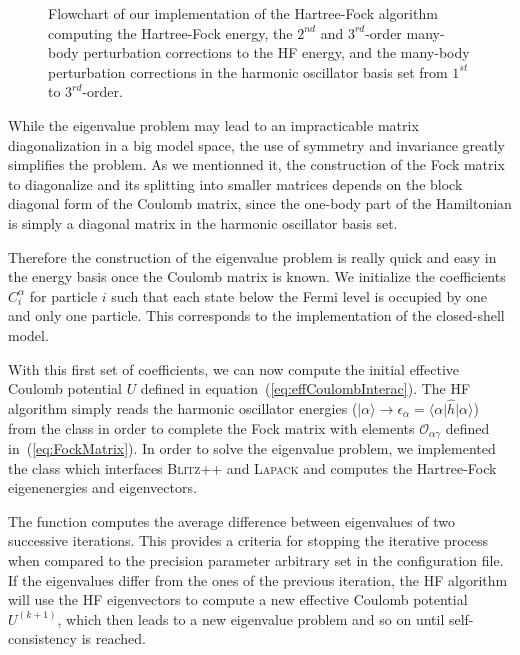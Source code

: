\begin{figure}
\centering
\scalebox{0.7}{}
\caption{\label{fig:diagramHF}Flowchart of our implementation of the Hartree-Fock algorithm computing the Hartree-Fock energy, the $2^{nd}$ and $3^{rd}$-order many-body perturbation corrections to the HF energy, and the many-body perturbation corrections in the harmonic oscillator basis set from $1^{st}$ to $3^{rd}$-order.}
\end{figure}

While the eigenvalue problem may lead to an impracticable matrix diagonalization in a big model space, the use of symmetry and invariance greatly simplifies the problem. As we mentionned it, the construction of the Fock matrix to diagonalize and its splitting into smaller matrices depends on the block diagonal form of the Coulomb matrix, since the one-body part of the Hamiltonian is simply a diagonal matrix in the harmonic oscillator basis set.

Therefore the construction of the eigenvalue problem is really quick and easy in the energy basis once the Coulomb matrix is known. We initialize the coefficients $C_i^{\alpha}$ for particle $i$ such that each state below the Fermi level is occupied by one and only one particle. This corresponds to the implementation of the closed-shell model.

With this first set of coefficients, we can now compute the initial effective Coulomb potential $U$ defined in equation~(\ref{eq:effCoulombInterac}). The HF algorithm simply reads the harmonic oscillator energies ($|\alpha \rangle  \rightarrow \epsilon_{\alpha}=\langle \alpha|\hat{h} | \alpha \rangle$) from the  class in order to complete the Fock matrix with elements $\mathcal{O}_{\alpha \gamma}$ defined in~(\ref{eq:FockMatrix}).
In order to solve the eigenvalue problem, we implemented the class  which interfaces \textsc{Blitz++} and \textsc{Lapack} and computes the Hartree-Fock eigenenergies and eigenvectors.

The function   computes the average difference between eigenvalues of two successive iterations. This provides a criteria for stopping the iterative process when compared to the precision parameter arbitrary set in the configuration file. If the eigenvalues differ from the ones of the previous iteration, the HF algorithm will use the HF eigenvectors to compute a new effective Coulomb potential $U^{(k+1)}$, which then leads to a new eigenvalue problem and so on until self-consistency is reached.

